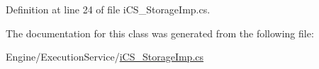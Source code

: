 Definition at line 24 of file i\+C\+S\+\_\+\+Storage\+Imp.\+cs.



The documentation for this class was generated from the following file\+:\begin{DoxyCompactItemize}
\item 
Engine/\+Execution\+Service/\hyperlink{i_c_s___storage_imp_8cs}{i\+C\+S\+\_\+\+Storage\+Imp.\+cs}\end{DoxyCompactItemize}
